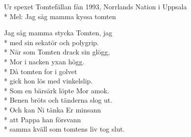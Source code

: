 \begin{SongText}[Julvisa]
    \begin{SongInfo}
        Ur spexet Tomtefällan fån 1993, Norrlands Nation i Uppsala\\*%
        Mel: Jag såg mamma kyssa tomten
    \end{SongInfo}
    \begin{SongVerse}
        Jag såg mamma stycka Tomten, jag\\*%
        med sin sekatör och polygrip.\\*%
        När som Tomten drack sin glögg,\\*%
        Mor i nacken yxan högg.\\*%
        Då tomten for i golvet\\*%
        gick hon lös med vinkelslip.\\*%
        Som en bärsärk löpte Mor amok.\\*%
        Benen bröts och tänderna slog ut.\\*%
        Och kan Ni tänka Er minsann\\*%
        att Pappa han försvann\\*%
        samma kväll som tomtens liv tog slut.
    \end{SongVerse}
\end{SongText}
